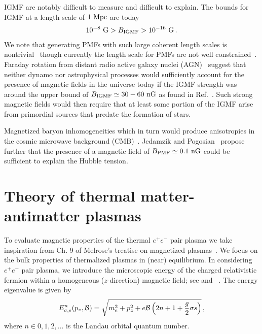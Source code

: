 IGMF are notably difficult to measure and difficult to explain. The bounds for IGMF at a length scale of $1{\rm\ Mpc}$ are today~\citep{Neronov:2010gir,Taylor:2011bn,Pshirkov:2015tua,Jedamzik:2018itu,Vernstrom:2021hru}
\begin{gather}
 \label{igmf}
 10^{-8}{\rm\ G}>B_{\rm IGMF}>10^{-16}{\rm\ G}\,.
\end{gather}
We note that generating PMFs with such large coherent length scales is nontrivial~\citep{Giovannini:2022rrl} though currently the length scale for PMFs are not well constrained~\citep{AlvesBatista:2021sln}. Faraday rotation from distant radio active galaxy nuclei (AGN)~\citep{Pomakov:2022cem} suggest that neither dynamo nor astrophysical processes would sufficiently account for the presence of magnetic fields in the universe today if the IGMF strength was around the upper bound of $B_{\rm IGMF}\simeq30-60{\rm\ nG}$ as found in Ref.~\citep{Vernstrom:2021hru}. Such strong magnetic fields would then require that at least some portion of the IGMF arise from primordial sources that predate the formation of stars.

Magnetized baryon inhomogeneities which in turn would produce anisotropies in the cosmic microwave background (CMB)~\cite{Jedamzik:2013gua,Abdalla:2022yfr}. Jedamzik and Pogosian~\cite{Jedamzik:2020krr} propose further that the presence of a magnetic field of $B_{\rm PMF}\simeq0.1{\rm\ nG}$ could be sufficient to explain the Hubble tension.

\section{Theory of thermal matter-antimatter plasmas}
\label{sec:theory}
\noindent To evaluate magnetic properties of the thermal $e^{+}e^{-}$ pair plasma we take inspiration from Ch. 9 of Melrose's treatise on magnetized plasmas~\citep{melrose2008quantum}. We focus on the bulk properties of thermalized plasmas in (near) equilibrium. In considering $e^{+}e^{-}$ pair plasma, we introduce the microscopic energy of the charged relativistic fermion within a homogeneous ($z$-direction) magnetic field; see  and ~\citep{Steinmetz:2018ryf}. The energy eigenvalue is given by
\begin{align}
 \label{kgp}
 E^{n}_{\sigma,s}(p_{z},{\cal B})=\sqrt{m_{e}^{2}+p_{z}^{2}+e{\cal B}\left(2n+1+\frac{g}{2}\sigma s\right)}\,,
\end{align}
where $n\in0,1,2,\ldots$ is the Landau orbital quantum number.


